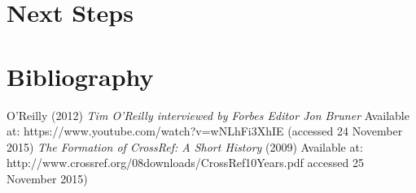 \documentclass[11pt, oneside]{article}   	%
\begin{document}
\section{Next Steps}
\section{Bibliography}
\begin{thebibliography}{9}
 O'Reilly (2012) \emph{Tim O'Reilly interviewed by Forbes Editor Jon Bruner} Available at: https://www.youtube.com/watch?v=wNLhFi3XhIE (accessed 24 November 2015)
\emph{The Formation of CrossRef: A Short History} (2009) Available at: http://www.crossref.org/08downloads/CrossRef10Years.pdf
accessed 25 November 2015)

\end{thebibliography}
\end{document}
